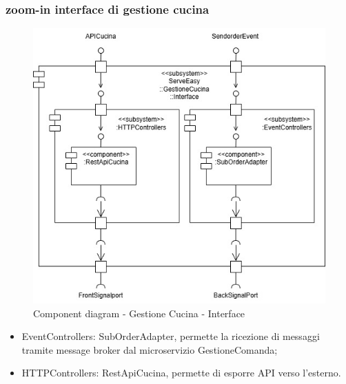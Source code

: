 \subsubsection{zoom-in interface di gestione cucina}
\begin{figure}[H]
	\centering
	\includegraphics[scale=0.5]{iterazione1/images/component_comanda_cucina-GestioneCucina__Interface.jpg}
	\caption{Component diagram - Gestione Cucina - Interface \label{fig:component_diagram_gestione_cucina_interface}}
\end{figure}
\begin{itemize}
    \item EventControllers: SubOrderAdapter, permette la ricezione di messaggi tramite message broker dal microservizio GestioneComanda;
    \item HTTPControllers: RestApiCucina, permette di esporre API verso l'esterno.
\end{itemize}



\clearpage